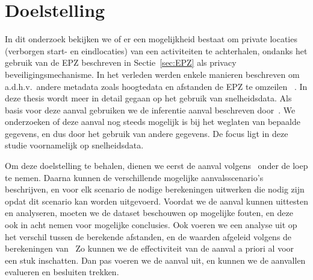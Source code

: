\section{Doelstelling}
In dit onderzoek bekijken we of er een mogelijkheid bestaat om private locaties
(verborgen start- en eindlocaties) van een activiteiten te achterhalen, ondanks
het gebruik van de \ac{EPZ} beschreven in Sectie~\ref{sec:EPZ} als privacy
beveiligingsmechanisme. In het verleden werden enkele manieren beschreven om
a.d.h.v.\ andere metadata zoals hoogtedata en afstanden de \ac{EPZ} te omzeilen
~\cite{Verdonck_2022, Dhondt, sec18has3}. In deze thesis wordt meer in detail
gegaan op het gebruik van snelheidsdata. Als basis voor deze aanval gebruiken
we de inferentie aanval beschreven door~\citeauthor{Dhondt}. We onderzoeken of
deze aanval nog steeds mogelijk is bij het weglaten van bepaalde gegevens, en
dus door het gebruik van andere gegevens. De focus ligt in deze studie
voornamelijk op snelheidsdata.

Om deze doelstelling te behalen, dienen we eerst de aanval
volgens~\citeauthor{Dhondt} onder de loep te nemen. Daarna kunnen de
verschillende mogelijke aanvalsscenario's beschrijven, en voor elk scenario de
nodige berekeningen uitwerken die nodig zijn opdat dit scenario kan worden
uitgevoerd. Voordat we de aanval kunnen uittesten en analyseren, moeten we de
dataset beschouwen op mogelijke fouten, en deze ook in acht nemen voor
mogelijke conclusies. Ook voeren we een analyse uit op het verschil tussen de
berekende afstanden, en de waarden afgeleid volgens de berekeningen
van~\citeauthor{Dhondt} Zo kunnen we de effectiviteit van de aanval a priori al
voor een stuk inschatten. Dan pas voeren we de aanval uit, en kunnen we de
aanvallen evalueren en besluiten trekken.

